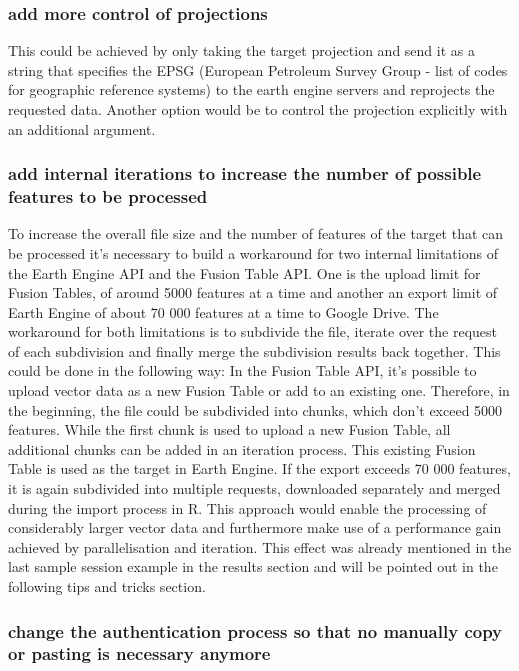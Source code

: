 \subsubsection{add more control of projections}

This could be achieved by only taking the target projection and send it as a string that specifies the EPSG (European Petroleum Survey Group - list of codes for geographic reference systems) to the earth engine servers and reprojects the requested data. Another option would be to control the projection explicitly with an additional argument.

\subsubsection{add internal iterations to increase the number of possible features to be processed}

To increase the overall file size and the number of features of the target that can be processed it's necessary to build a workaround for two internal limitations of the Earth Engine API and the Fusion Table API. One is the upload limit for Fusion Tables, of around 5000 features at a time and another an export limit of Earth Engine of about 70 000 features at a time to Google Drive. The workaround for both limitations is to subdivide the file, iterate over the request of each subdivision and finally merge the subdivision results back together. This could be done in the following way: In the Fusion Table API, it's possible to upload vector data as a new Fusion Table or add to an existing one. Therefore, in the beginning, the file could be subdivided into chunks, which don't exceed 5000 features. While the first chunk is used to upload a new Fusion Table, all additional chunks can be added in an iteration process. This existing Fusion Table is used as the target in Earth Engine. If the export exceeds 70 000 features, it is again subdivided into multiple requests, downloaded separately and merged during the import process in R. This approach would enable the processing of considerably larger vector data and furthermore make use of a performance gain achieved by parallelisation and iteration. This effect was already mentioned in the last sample session example in the results section and will be pointed out in the following tips and tricks section.

\subsubsection{change the authentication process so that no manually copy or pasting is necessary anymore}

